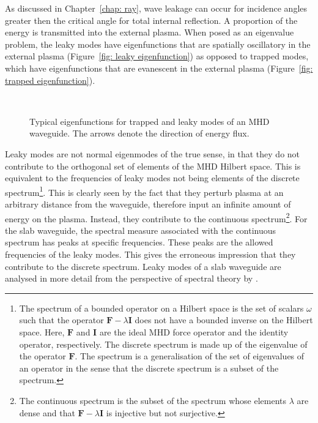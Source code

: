 As discussed in Chapter~\ref{chap: ray}, wave leakage can occur for incidence angles greater then the critical angle for total internal reflection. A proportion of the energy is transmitted into the external plasma. When posed as an eigenvalue problem, the leaky modes have eigenfunctions that are spatially oscillatory in the external plasma (Figure~\ref{fig: leaky eigenfunction}) as opposed to trapped modes, which have eigenfunctions that are evanescent in the external plasma (Figure~\ref{fig: trapped eigenfunction}).
\begin{figure}
	 \\
	\caption{Typical eigenfunctions for trapped and leaky modes of an MHD waveguide. The arrows denote the direction of energy flux.}
	\label{fig: eigenfunction}
\end{figure}
Leaky modes are not normal eigenmodes of the true sense, in that they do not contribute to the orthogonal set of elements of the MHD Hilbert space. This is equivalent to the frequencies of leaky modes not being elements of the discrete spectrum\footnote{The spectrum of a bounded operator on a Hilbert space is the set of scalars $\omega$ such that the operator $\mathbf{F} - \lambda\mathbf{I}$ does not have a bounded inverse on the Hilbert space. Here, $\mathbf{F}$ and $\mathbf{I}$ are the ideal MHD force operator and the identity operator, respectively. The discrete spectrum is made up of the eigenvalue of the operator $\mathbf{F}$. The spectrum is a generalisation of the set of eigenvalues of an operator in the sense that the discrete spectrum is a subset of the spectrum.}. This is clearly seen by the fact that they perturb plasma at an arbitrary distance from the waveguide, therefore input an infinite amount of energy on the plasma. Instead, they contribute to the continuous spectrum\footnote{The continuous spectrum is the subset of the spectrum whose elements $\lambda$ are dense and that $\mathbf{F} - \lambda\mathbf{I}$ is injective but not surjective.}. For the slab waveguide, the spectral measure associated with the continuous spectrum has peaks at specific frequencies. These peaks are the allowed frequencies of the leaky modes. This gives the erroneous impression that they contribute to the discrete spectrum. Leaky modes of a slab waveguide are analysed in more detail from the perspective of spectral theory by \cite{and_etal07}.

